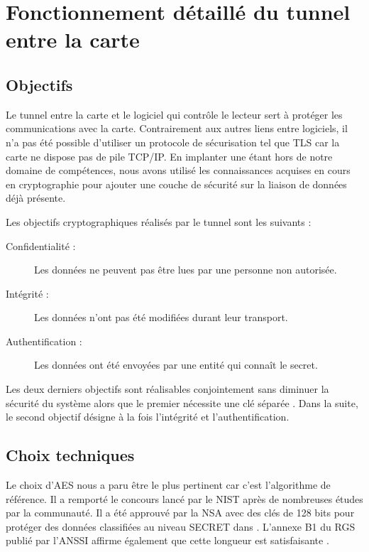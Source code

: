 \documentclass[a4paper,11pt,french]{article}
\begin{document}
\appendix

\section{Fonctionnement détaillé du tunnel entre la carte}
\label{TunnelSS}


\subsection{Objectifs}
Le tunnel entre la carte et le logiciel qui contr\^ole le lecteur sert à 
protéger les communications avec la carte. Contrairement aux autres liens entre 
logiciels, il n'a pas été possible d'utiliser un protocole de sécurisation tel 
que TLS car la carte ne dispose pas de pile TCP/IP. En implanter une étant hors
de notre domaine de compétences, nous avons utilisé les connaissances acquises 
en cours en cryptographie pour ajouter une couche de sécurité sur la liaison de 
données déjà présente. 

Les objectifs cryptographiques réalisés par le tunnel sont les suivants : 
\begin{description}
    \item[Confidentialité :] Les données ne peuvent pas être lues par une 
        personne non autorisée.
    \item[Intégrité :] Les données n'ont pas été modifiées durant leur 
        transport.
    \item[Authentification :] Les données ont été envoyées par une entité qui 
        connaît le secret.
\end{description}
Les deux derniers objectifs sont réalisables conjointement sans diminuer la 
sécurité du système alors que le premier nécessite une clé séparée \cite[section
2.5.1]{RGS ANSSI}. Dans la suite, le second objectif désigne à la fois 
l'intégrité et l'authentification. 


\subsection{Choix techniques}
Le choix d'AES nous a paru être le plus pertinent car c'est l'algorithme de 
référence. Il a remporté le concours lancé par le NIST après de nombreuses 
études par la communauté. Il a été approuvé par la NSA avec des clés de 128
bits pour protéger des données classifiées au niveau SECRET dans \cite{NSA}. 
L'annexe B1 du RGS publié par l'ANSSI affirme également que cette longueur est
satisfaisante \cite{RGS ANSSI}. 
\end{document}
